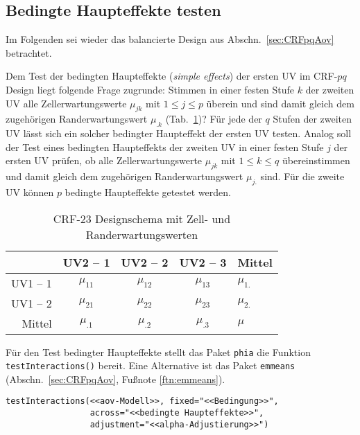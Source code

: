 \subsection{Bedingte Haupteffekte testen}
\label{sec:simpleEffects}

Im Folgenden sei wieder das balancierte Design aus Abschn.\ \ref{sec:CRFpqAov} betrachtet.

Dem Test der bedingten Haupteffekte (\emph{simple effects}) der ersten UV im CRF-$pq$ Design liegt folgende Frage zugrunde: Stimmen in einer festen Stufe $k$ der zweiten UV alle Zellerwartungswerte $\mu_{jk}$ mit $1 \leq j \leq p$ überein und sind damit gleich dem zugehörigen Randerwartungswert $\mu_{.k}$ (Tab.\ \ref{tab:CRF23})? Für jede der $q$ Stufen der zweiten UV lässt sich ein solcher bedingter Haupteffekt der ersten UV testen. Analog soll der Test eines bedingten Haupteffekts der zweiten UV in einer festen Stufe $j$ der ersten UV prüfen, ob alle Zellerwartungswerte $\mu_{jk}$ mit $1 \leq k \leq q$ übereinstimmen und damit gleich dem zugehörigen Randerwartungswert $\mu_{j.}$ sind. Für die zweite UV können $p$ bedingte Haupteffekte getestet werden.

\begin{table}[ht]
\centering
\caption{CRF-$23$ Designschema mit Zell- und Randerwartungswerten}
\label{tab:CRF23}
\begin{tabular}{rcccl}
\hline
~ & \sffamily UV2 -- 1 & \sffamily UV2 -- 2 & \sffamily UV2 -- 3 &
\sffamily Mittel\\\hline\hline
\sffamily UV1 -- 1 & $\mu_{11}$ & $\mu_{12}$ & $\mu_{13}$ & $\mu_{1.}$\\
\sffamily UV1 -- 2 & $\mu_{21}$ & $\mu_{22}$ & $\mu_{23}$ & $\mu_{2.}$\\
\sffamily Mittel   & $\mu_{.1}$ & $\mu_{.2}$ & $\mu_{.3}$ & $\mu$\\\hline
\end{tabular}
\end{table}

Für den Test bedingter Haupteffekte stellt das Paket \lstinline!phia! \cite{DeRosarioMartinez2013} die Funktion \lstinline!testInteractions()! bereit. Eine Alternative ist das Paket \lstinline!emmeans! (Abschn.\ \ref{sec:CRFpqAov}, Fußnote \ref{ftn:emmeans}).
\begin{lstlisting}
testInteractions(<<aov-Modell>>, fixed="<<Bedingung>>",
                 across="<<bedingte Haupteffekte>>",
                 adjustment="<<alpha-Adjustierung>>")
\end{lstlisting}


